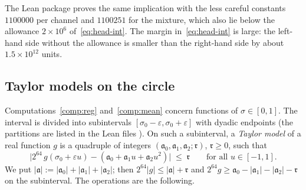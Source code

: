 \documentclass[11pt,reqno]{amsart}
\theoremstyle{definition}
\numberwithin{equation}{section}
\begin{document}
The Lean package proves the same implication with the less careful constants $1100000$ per channel and $1100251$ for the mixture, which also lie below the allowance $2\times10^6$ of~\eqref{eq:head-int}. The margin in~\eqref{eq:head-int} is large: the left-hand side without the allowance is smaller than the right-hand side by about $1.5\times10^{12}$ units.

\subsection{Taylor models on the circle}\label{app:taylor}
Computations~\ref{comp:reg} and~\ref{comp:mean} concern functions of $\sigma\in[0,1]$. The interval is divided into subintervals $[\sigma_0-\varepsilon,\sigma_0+\varepsilon]$ with dyadic endpoints (the partitions are listed in the Lean files ). On such a subinterval, a \emph{Taylor model} of a real function $g$ is a quadruple of integers $(\mathfrak{a}_0,\mathfrak{a}_1,\mathfrak{a}_2;\mathfrak{r})$, $\mathfrak{r}\ge0$, such that
\[
  \bigl|2^{64}\,g(\sigma_0+\varepsilon u)-(\mathfrak{a}_0+\mathfrak{a}_1u+\mathfrak{a}_2u^2)\bigr|\;\le\;\mathfrak{r}\qquad\text{for all }u\in[-1,1].
\]
We put $|\mathfrak{a}|:=|\mathfrak{a}_0|+|\mathfrak{a}_1|+|\mathfrak{a}_2|$; then $2^{64}|g|\le|\mathfrak{a}|+\mathfrak{r}$ and $2^{64}g\ge\mathfrak{a}_0-|\mathfrak{a}_1|-|\mathfrak{a}_2|-\mathfrak{r}$ on the subinterval. The operations are the following.
\end{document}
